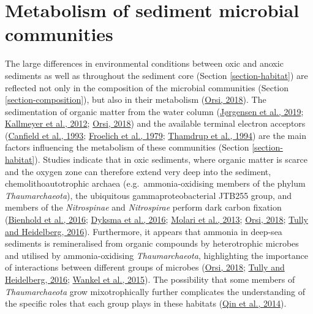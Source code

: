 \documentclass[
  12 pt,
]{book}
\begin{document}
\hypertarget{metabolism-of-sediment-microbial-communities}{%
\section{Metabolism of sediment microbial communities}\label{metabolism-of-sediment-microbial-communities}}

The large differences in environmental conditions between oxic and anoxic sediments as well as throughout the sediment core (Section \ref{section-habitat}) are reflected not only in the composition of the microbial communities (Section \ref{section-composition}), but also in their metabolism (\protect\hyperlink{ref-Orsi2018}{Orsi, 2018}). The sedimentation of organic matter from the water column (\protect\hyperlink{ref-Jorgensen2019}{Jørgensen et al., 2019}; \protect\hyperlink{ref-Kallmeyer2012}{Kallmeyer et al., 2012}; \protect\hyperlink{ref-Orsi2018}{Orsi, 2018}) and the available terminal electron acceptors (\protect\hyperlink{ref-Canfield1993}{Canfield et al., 1993}; \protect\hyperlink{ref-Froelich1979}{Froelich et al., 1979}; \protect\hyperlink{ref-Thamdrup1994}{Thamdrup et al., 1994}) are the main factors influencing the metabolism of these communities (Section \ref{section-habitat}). Studies indicate that in oxic sediments, where organic matter is scarce and the oxygen zone can therefore extend very deep into the sediment, chemolithoautotrophic archaea (e.g.~ammonia-oxidising members of the phylum \emph{Thaumarchaeota}), the ubiquitous gammaproteobacterial JTB255 group, and members of the \emph{Nitrospinae} and \emph{Nitrospirae} perform dark carbon fixation (\protect\hyperlink{ref-Bienhold2016}{Bienhold et al., 2016}; \protect\hyperlink{ref-Dyksma2016}{Dyksma et al., 2016}; \protect\hyperlink{ref-Molari2013}{Molari et al., 2013}; \protect\hyperlink{ref-Orsi2018}{Orsi, 2018}; \protect\hyperlink{ref-Tully2016}{Tully and Heidelberg, 2016}). Furthermore, it appears that ammonia in deep-sea sediments is remineralised from organic compounds by heterotrophic microbes and utilised by ammonia-oxidising \emph{Thaumarchaeota}, highlighting the importance of interactions between different groups of microbes (\protect\hyperlink{ref-Orsi2018}{Orsi, 2018}; \protect\hyperlink{ref-Tully2016}{Tully and Heidelberg, 2016}; \protect\hyperlink{ref-Wankel2015}{Wankel et al., 2015}). The possibility that some members of \emph{Thaumarchaeota} grow mixotrophically further complicates the understanding of the specific roles that each group plays in these habitats (\protect\hyperlink{ref-Qin2014}{Qin et al., 2014}).
\end{document}
